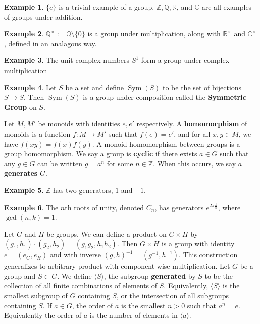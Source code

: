 \documentclass[12pt, reqno]{article}
\theoremstyle{plain}
\theoremstyle{definition}
\newtheorem*{example}{Example}
\theoremstyle{remark}
\begin{document}
\begin{example}
    $\{e\}$ is a trivial example of a group. $\mathbb{Z}, \mathbb{Q}, \mathbb{R}$, and $\mathbb{C}$ are all
    examples of groups under addition.
\end{example}

\begin{example}
    $\mathbb{Q}^\times := \mathbb{Q} \setminus \{0\}$ is a group under multiplication, along with $\mathbb{R}^\times$ 
    and $\mathbb{C}^\times$, defined in an analagous way.
\end{example}

\begin{example}
    The unit complex numbers $S^1$ form a group under complex multiplication
\end{example}

\begin{example}
    Let $S$ be a set and define $\operatorname{Sym}(S)$ to be the set of bijections $S \rightarrow S$. Then $\operatorname{Sym}(S)$
    is a group under composition called the \textbf{Symmetric Group} on $S$.
\end{example}

Let $M, M'$ be monoids with identities $e, e'$ respectively. A \textbf{homomorphism} of monoids is a function 
$f: M \rightarrow M'$ such that $f(e) = e'$, and for all $x,y \in M$, we have $f(xy) = f(x)f(y)$. A monoid homomorphism
between groups is a group homomorphism.
\bigbreak
We say a group is \textbf{cyclic} if there exists $a \in G$ such that any $g \in G$ can be written $g = a^n$ for 
some $n \in \mathbb{Z}$. When this occurs, we say $a$ \textbf{generates} $G$. 

\begin{example}
    $\mathbb{Z}$ has two generators, $1$ and $-1$.
\end{example}

\begin{example}
    The $n$th roots of unity, denoted $C_n$, has generators $e^{2\pi\frac{k}{n}}$, where $\gcd(n,k) = 1$.
\end{example}

Let $G$ and $H$ be groups. We can define a product on $G\times H$ by $(g_1, h_1)\cdot(g_2,h_2) = (g_1 g_2, h_1 h_2)$.
Then $G\times H$ is a group with identity $e = (e_G,e_H)$ and with inverse $(g,h)^{-1} = (g^{-1}, h^{-1})$. This 
construction generalizes to arbitrary product with component-wise multiplication.
\bigbreak
Let $G$ be a group and $S \subset G$. We define $\langle S\rangle$, the subgroup \textbf{generated} by $S$ to
be the collection of all finite combinations of elements of $S$. Equivalently, $\langle S \rangle$ is the smallest
subgroup of $G$ containing $S$, or the intersection of all subgroups containing $S$. If $a \in G$, the order of $a$
is the smallest $n > 0$ such that $a^n = e$. Equivalently the order of $a$ is the number of elements in $\langle a \rangle$. 
\end{document}
